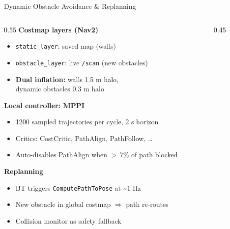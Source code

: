 \documentclass[10pt,aspectratio=169]{beamer}
\begin{document}
\begin{frame}{Dynamic Obstacle Avoidance \& Replanning}
  \begin{columns}[T]
    \begin{column}{0.55\textwidth}
      \textbf{Costmap layers (Nav2)}
      \begin{itemize}
        \item \texttt{static\_layer}: saved map (walls)
        \item \texttt{obstacle\_layer}: live \texttt{/scan} (new obstacles)
        \item \textbf{Dual inflation:}
          walls 1.5 m halo, \\ dynamic obstacles 0.3 m halo
      \end{itemize}
      \vspace{0.4em}
      \textbf{Local controller: MPPI}
      \begin{itemize}
        \item 1200 sampled trajectories per cycle, 2 s horizon
        \item Critics: CostCritic, PathAlign, PathFollow, \dots
        \item Auto-disables PathAlign when $>$\,7\% of path blocked
      \end{itemize}
      \vspace{0.4em}
      \textbf{Replanning}
      \begin{itemize}
        \item BT triggers \texttt{ComputePathToPose} at \textasciitilde 1 Hz
        \item New obstacle in global costmap $\Rightarrow$ path re-routes
        \item Collision monitor as safety fallback
      \end{itemize}
    \end{column}
    \begin{column}{0.45\textwidth}
      \centering
    \end{column}
  \end{columns}
\end{frame}
\end{document}
